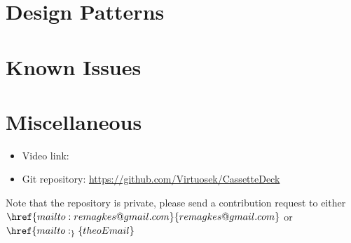 \documentclass[11pt]{article}
\begin{document}
\section{Design Patterns}
\section{Known Issues}
\section{Miscellaneous}
\begin{itemize}
  \item Video link: %
  \item Git repository: \url{https://github.com/Virtuosek/CassetteDeck}
\end{itemize}
Note that the repository is private, please send a contribution request to either $\href{mailto:remagkes@gmail.com}{remagkes@gmail.com} $ or $\href{mailto:_}{theoEmail}$
\end{document}
